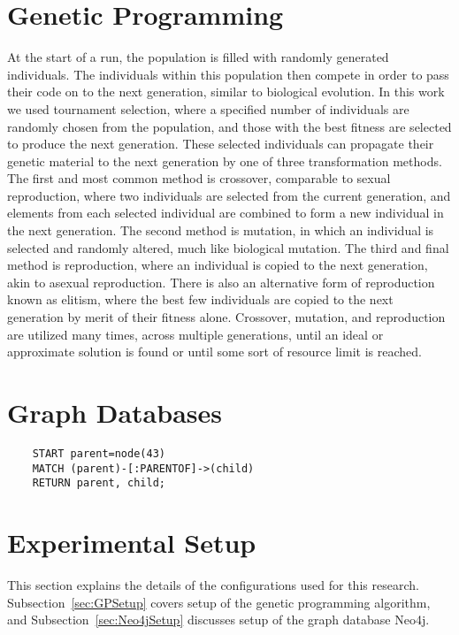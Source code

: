 \documentclass[12pt]{article}
\begin{document}
\section{Genetic Programming} \label{Genetic Programming}


At the start of a run, the population is filled with randomly generated individuals. The individuals within this population then compete in order to pass their code on to the next generation, similar to biological evolution. In this work we used tournament selection, where a specified number of individuals are randomly chosen from the population, and those with the best fitness are selected to produce the next generation. These selected individuals can propagate their genetic material to the next generation by one of three transformation methods. The first and most common method is crossover, comparable to sexual reproduction, where two individuals are selected from the current generation, and elements from each selected individual are combined to form a new individual in the next generation. The second method is mutation, in which an individual is selected and randomly altered, much like biological mutation. The third and final method is reproduction, where an individual is copied to the next generation, akin to asexual reproduction. There is also an alternative form of reproduction known as elitism, where the best few individuals are copied to the next generation by merit of their fitness alone. Crossover, mutation, and reproduction are utilized many times, across multiple generations, until an ideal or approximate solution is found or until some sort of resource limit is reached.

\section{Graph Databases}
\label{sec:Graph Databases}



\begin{verbatim}
    START parent=node(43)
    MATCH (parent)-[:PARENTOF]->(child)
    RETURN parent, child;
\end{verbatim}


\section{Experimental Setup} 
\label{sec:experiments}

This section explains the details of the configurations used for this research. Subsection~\ref{sec:GPSetup} covers setup of the genetic programming algorithm, and Subsection~\ref{sec:Neo4jSetup} discusses setup of the graph database Neo4j.
\end{document}

